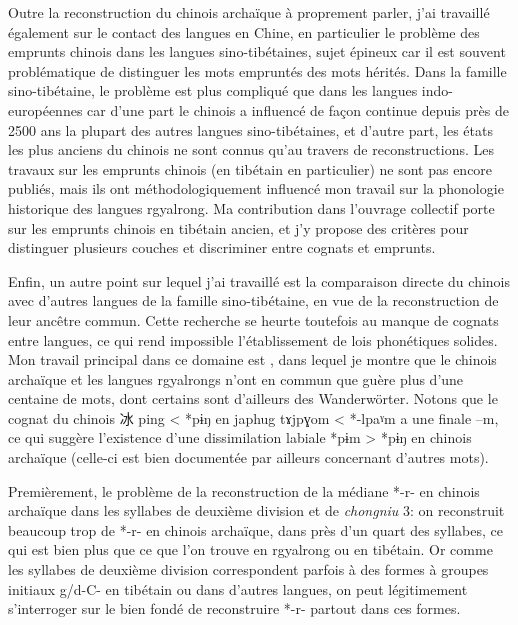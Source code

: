 \documentclass[oldfontcommands,oneside,a4paper,11pt]{memoir}
\newcommand{\ipa}[1]{{\phon #1}} %
\newcommand{\zh}[1]{{\cn #1}}
\begin{document}
Outre la reconstruction du chinois archaïque à proprement parler, j'ai travaillé également sur le contact des langues en Chine, en particulier le problème des emprunts chinois dans les langues sino-tibétaines, sujet épineux car il est souvent problématique de distinguer les mots empruntés des mots hérités. Dans la famille sino-tibétaine, le problème est plus compliqué que dans les langues indo-européennes car d’une part le chinois a influencé de façon continue depuis près de 2500 ans la plupart des autres langues sino-tibétaines, et d’autre part, les états les plus anciens du chinois ne sont connus qu’au travers de reconstructions. Les travaux sur les emprunts chinois (en tibétain en particulier) ne sont pas encore publiés, mais ils ont méthodologiquement influencé mon travail sur la phonologie historique des langues rgyalrong. Ma contribution dans l'ouvrage collectif \citet{jacques13jieci} porte sur les emprunts chinois en tibétain ancien, et j'y propose des critères pour distinguer plusieurs couches et discriminer entre cognats et emprunts.

Enfin, un autre point sur lequel j'ai travaillé est la comparaison directe du chinois avec d'autres langues de la famille sino-tibétaine, en vue de la reconstruction de leur ancêtre commun. Cette recherche se heurte toutefois au manque de cognats entre langues, ce qui rend impossible l'établissement de lois phonétiques solides. Mon travail principal dans ce domaine est \citet{jacques05}, dans lequel je montre que le chinois archaïque et les langues rgyalrongs n'ont en commun que guère plus d'une centaine de mots, dont certains sont d'ailleurs des Wanderwörter. Notons que le cognat du chinois \zh{冰} ping < *pɨŋ en japhug \ipa{tɤjpɣom} < *-lpaˠm a une finale --m, ce qui suggère l'existence d'une dissimilation labiale *pɨm > *pɨŋ en chinois archaïque (celle-ci est bien documentée par ailleurs concernant d'autres mots).

 


Premièrement, le problème de la reconstruction de la médiane *-r- en chinois archaïque dans les syllabes de deuxième division et de \textit{chongniu} 3: on reconstruit beaucoup trop de *-r- en chinois archaïque, dans près d'un quart des syllabes, ce qui est bien plus que ce que l'on trouve en rgyalrong ou en tibétain. Or comme les syllabes de deuxième division correspondent parfois à des formes à groupes initiaux g/d-C- en tibétain ou dans d'autres langues, on peut légitimement s'interroger sur le bien fondé de reconstruire *-r- partout dans ces formes. 
\end{document}
